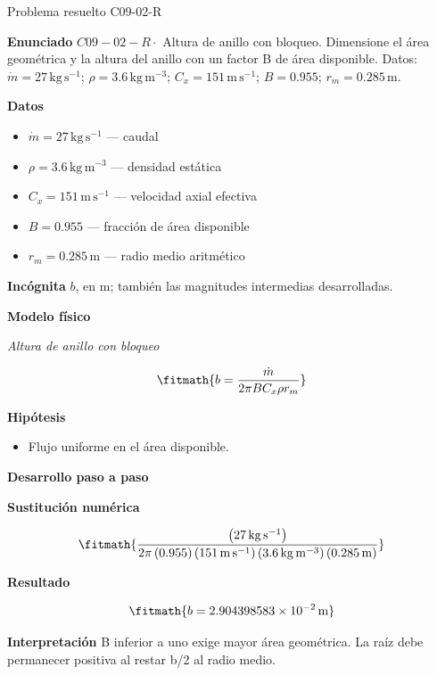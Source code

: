 \documentclass[10pt,openany]{book}
\begin{document}
\begin{studiumworked}{Problema resuelto C09-02-R}


\noindent\textbf{Enunciado}
\(C09-02-R \cdot\) Altura de anillo con bloqueo. Dimensione el área geométrica y la altura del anillo con un factor B de área disponible. Datos: \(\dot m=27\, \mathrm{kg}\,\mathrm{s}^{-1}\); \(\rho=3.6\, \mathrm{kg}\,\mathrm{m}^{-3}\); \(C_x=151\, \mathrm{m}\,\mathrm{s}^{-1}\); \(B=0.955\); \(r_m=0.285\, \mathrm{m}\).

\noindent\textbf{Datos}
\begin{itemize}
\item $\dot m = 27\,\mathrm{kg}\,\mathrm{s}^{-1}$ — caudal
\item $\rho = 3.6\,\mathrm{kg}\,\mathrm{m}^{-3}$ — densidad estática
\item $C_x = 151\,\mathrm{m}\,\mathrm{s}^{-1}$ — velocidad axial efectiva
\item $B = 0.955$ — fracción de área disponible
\item $r_m = 0.285\,\mathrm{m}$ — radio medio aritmético
\end{itemize}

\noindent\textbf{Incógnita}
$b$, en $\mathrm{m}$; también las magnitudes intermedias desarrolladas.

\noindent\textbf{Modelo físico}

\noindent\textit{Altura de anillo con bloqueo}

\[
\fitmath{b=\frac{\dot m}{2 \pi B C_x \rho r_m}}
\]

\noindent\textbf{Hipótesis}
\begin{itemize}
\item Flujo uniforme en el área disponible.
\end{itemize}

\noindent\textbf{Desarrollo paso a paso}



\noindent\textbf{Sustitución numérica}

\[
\fitmath{\frac{\left(27\,\mathrm{kg}\,\mathrm{s}^{-1}\right)}{2 \pi \left(0.955\right) \left(151\,\mathrm{m}\,\mathrm{s}^{-1}\right) \left(3.6\,\mathrm{kg}\,\mathrm{m}^{-3}\right) \left(0.285\,\mathrm{m}\right)}}
\]

\noindent\textbf{Resultado}

\[
\fitmath{b=2.904398583\times10^{-2}\,\mathrm{m}}
\]

\noindent\textbf{Interpretación}
B inferior a uno exige mayor área geométrica. La raíz debe permanecer positiva al restar b/2 al radio medio.


\end{studiumworked}
\end{document}
